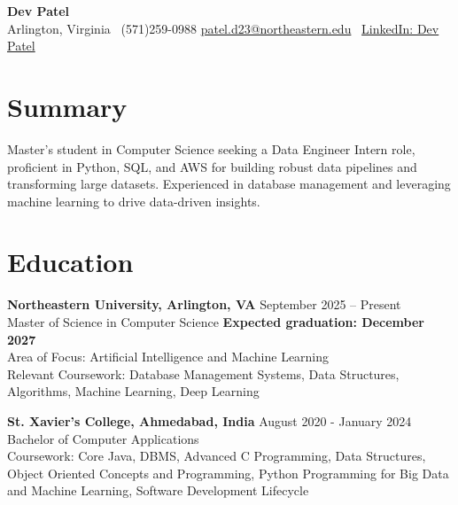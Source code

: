 \documentclass[a4paper,10pt]{article}
\begin{document}
\begin{center}
\vspace{-3mm}
    \fontsize{16}{18}\selectfont \textbf{Dev Patel} \\
    \vspace{0mm}
    \normalsize Arlington, Virginia \textbar\ (571)259-0988  \textbar       \href{mailto:patel.d23@northeastern.edu}{patel.d23@northeastern.edu} \textbar\ \href{https://www.linkedin.com/in/devxpatel//}{LinkedIn: Dev Patel} \\
\end{center}



\section*{Summary}
Master's student in Computer Science seeking a Data Engineer Intern role, proficient in Python, SQL, and AWS for building robust data pipelines and transforming large datasets. Experienced in database management and leveraging machine learning to drive data-driven insights.
 
\vspace{ 0 mm}
\section*{Education}
\textbf{Northeastern University, Arlington, VA} \hfill September 2025 -- Present\\
Master of Science in Computer Science \hfill \textbf{Expected graduation: December 2027} \\
Area of Focus: Artificial Intelligence and Machine Learning \\
Relevant Coursework: Database Management Systems, Data Structures, Algorithms, Machine Learning, Deep Learning

\vspace{1 mm} %
\textbf{St. Xavier's College, Ahmedabad, India} \hfill August 2020 - January 2024 \\
Bachelor of Computer Applications\\
Coursework: Core Java, DBMS, Advanced C Programming, Data Structures, Object Oriented Concepts and Programming, Python Programming for Big Data and Machine Learning, Software Development Lifecycle
\end{document}
